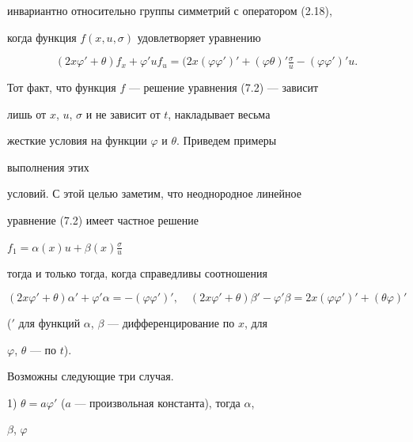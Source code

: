 инвариантно относительно группы симметрий с оператором (2.18), 


когда функция $f(x,u,\sigma)$ удовлетворяет уравнению 


\begin{equation} 


(2x\varphi'+\theta)f_x+\varphi'u f_u= 


(2x(\varphi\varphi')'+(\varphi\theta)'\tfrac{\sigma}{u}- 


(\varphi\varphi')'u.\tag{7.2} 


\end{equation} 


 


Тот факт, что функция $f$ --- решение уравнения (7.2) --- зависит 


лишь от $x$, $u$, $\sigma$ и не зависит от $t$, накладывает весьма 


жесткие условия на функции $\varphi$ и $\theta$. Приведем примеры 


выполнения этих 


условий. С этой целью заметим, что неоднородное линейное 


уравнение (7.2) имеет частное решение 


$f_1=\alpha(x)u+\beta(x)\frac{\sigma}{u}$ 


тогда и только тогда, когда справедливы соотношения 


\begin{equation} 


(2x\varphi'+\theta)\alpha'+\varphi'\alpha= 


-(\varphi\varphi')',\quad 


(2x\varphi'+\theta)\beta'-\varphi'\beta= 


2x(\varphi\varphi')'+(\theta\varphi)' \tag{7.3} 


\end{equation} 


(${}'$ для функций $\alpha$, $\beta$ --- дифференцирование по $x$, для 


$\varphi$, $\theta$ --- по $t$). 


 


Возможны следующие три случая. 


 


1) $\theta=a\varphi'$ ($a$ --- произвольная константа), тогда $\alpha$, 


$\beta$, $\varphi$ 


